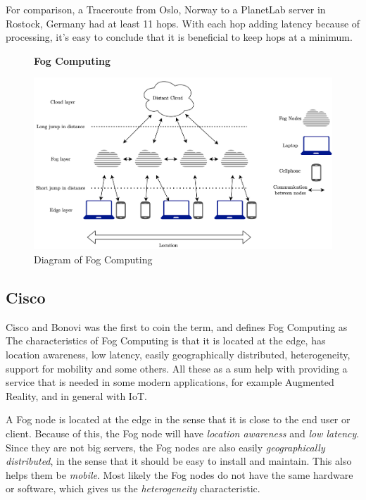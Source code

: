 For comparison, a Traceroute\cite{noauthor_traceroute68_nodate} from Oslo, Norway to a PlanetLab server in Rostock, Germany had at least 11 hops. With each hop adding latency because of processing, it’s easy to conclude that it is beneficial to keep hops at a minimum.

\begin{figure}[t]
    \centering
    \textbf{Fog Computing}\par\medskip
    \includegraphics[scale=0.7]{chapters/background/figures/Fog.png}
    \caption{Diagram of Fog Computing}
    \label{fig:FogDiagram}
\end{figure}

\subsection{Cisco}
Cisco\cite{bonomi_fog_nodate} and Bonovi was the first to coin the term, and defines Fog Computing as   The characteristics of Fog Computing is that it is located at the edge, has location awareness, low latency, easily geographically distributed, heterogeneity, support for mobility and some others. All these as a sum help with providing a service that is needed in some modern applications, for example Augmented Reality, and in general with IoT.

A Fog node is located at the edge in the sense that it is close to the end user or client. Because of this, the Fog node will have \textit{location awareness} and \textit{low latency}. Since they are not big servers, the Fog nodes are also easily \textit{geographically distributed}, in the sense that it should be easy to install and maintain. This also helps them be \textit{mobile}. Most likely the Fog nodes do not have the same hardware or software, which gives us the \textit{heterogeneity} characteristic. 

